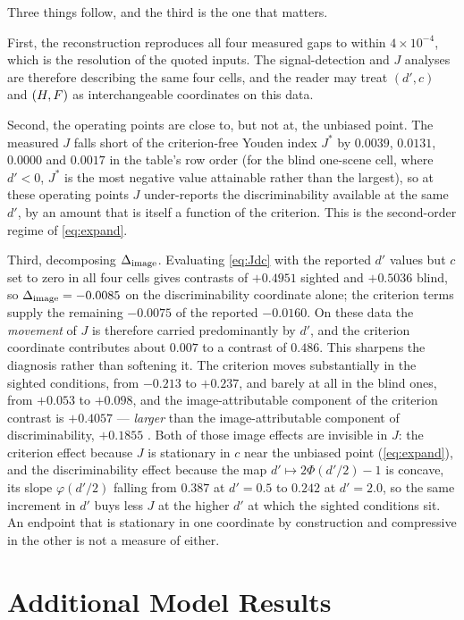 Three things follow, and the third is the one that matters.

First, the reconstruction reproduces all four measured gaps to within $4\times10^{-4}$, which is the
resolution of the quoted inputs. The signal-detection and $J$ analyses are therefore describing
the same four cells, and the reader may treat $(d', c)$ and $(H, F)$ as interchangeable
coordinates on this data.

Second, the operating points are close to, but not at, the unbiased point. The measured $J$ falls
short of the criterion-free Youden index $J^{*}$ by $0.0039$, $0.0131$, $0.0000$ and $0.0017$ in the
table's row order (for the blind one-scene cell, where $d' < 0$, $J^{*}$ is the most negative value
attainable rather than the largest), so at these operating points $J$ under-reports the discriminability available at the
same $d'$, by an amount that is itself a function of the criterion. This is the second-order regime
of \eqref{eq:expand}.

Third, decomposing $\Delta_{\mathrm{image}}$. Evaluating \eqref{eq:Jdc} with the reported $d'$ values but $c$ set to
zero in all four cells gives contrasts of $+0.4951$ sighted and $+0.5036$ blind, so
$\Delta_{\mathrm{image}} = -0.0085$ on the discriminability coordinate alone; the criterion terms supply the
remaining $-0.0075$ of the reported $-0.0160$. On these data the \emph{movement} of $J$ is
therefore carried predominantly by $d'$, and the criterion coordinate contributes about $0.007$ to a
contrast of $0.486$. This sharpens the diagnosis rather than softening it. The
criterion moves substantially in the sighted conditions, from $-0.213$ to $+0.237$, and barely at all
in the blind ones, from $+0.053$ to $+0.098$, and the image-attributable component of the criterion
contrast is $+0.4057$  --- \emph{larger} than the image-attributable component
of discriminability, $+0.1855$ . Both of those image effects are invisible in
$J$: the criterion effect because $J$ is stationary in $c$ near the unbiased point
(\eqref{eq:expand}), and the discriminability effect because the map $d' \mapsto 2\Phi(d'/2)-1$ is
concave, its slope $\varphi(d'/2)$ falling from $0.387$ at $d' = 0.5$ to $0.242$ at $d' = 2.0$, so
the same increment in $d'$ buys less $J$ at the higher $d'$ at which the sighted conditions sit. An
endpoint that is stationary in one coordinate by construction and compressive in the other is not a
measure of either.

\section{Additional Model Results}
\label{app:models}


